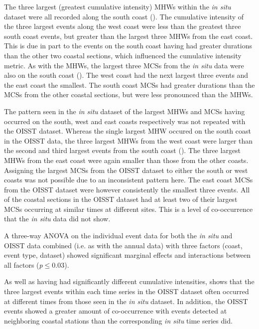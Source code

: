 \documentclass[a4paper,10pt,review]{elsarticle}
\begin{document}
The three largest (greatest cumulative intensity) MHWs within the \emph{in situ} dataset were all recorded along the south coast (). The cumulative intensity of the three largest events along the west coast were less than the greatest three south coast events, but greater than the largest three MHWs from the east coast. This is due in part to the events on the south coast having had greater durations than the other two coastal sections, which influenced the cumulative intensity metric. As with the MHWs, the largest three MCSs from the \emph{in situ} data were also on the south coast (). The west coast had the next largest three events and the east coast the smallest. The south coast MCSs had greater durations than the MCSs from the other coastal sections, but were less pronounced than the MHWs.

The pattern seen in the \emph{in situ} dataset of the largest MHWs and MCSs having occurred on the south, west and east coasts respectively was not repeated with the OISST dataset. Whereas the single largest MHW occured on the south coast in the OISST data, the three largest MHWs from the west coast were larger than the second and third largest events from the south coast (). The three largest MHWs from the east coast were again smaller than those from the other coasts. Assigning the largest MCSs from the OISST dataset to either the south or west coasts was not possible due to an inconsistent pattern here. The east coast MCSs from the OISST dataset were however consistently the smallest three events. All of the coastal sections in the OISST dataset had at least two of their largest MCSs occurring at similar times at different sites. This is a level of co-occurrence that the \emph{in situ} data did not show.

A three-way ANOVA on the individual event data for both the \emph{in situ} and OISST data combined (i.e. as with the annual data) with three factors (coast, event type, dataset) showed significant marginal effects and interactions between all factors (\emph{p}$\leq$0.03).

As well as having had significantly different cumulative intensities,  shows that the three largest events within each time series in the OISST dataset often occurred at different times from those seen in the \emph{in situ} dataset. In addition, the OISST events showed a greater amount of co-occurrence with events detected at neighboring coastal stations than the corresponding \emph{in situ} time series did.
\end{document}
